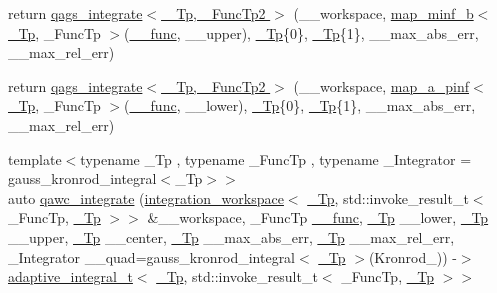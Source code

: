 \begin{DoxyCompactItemize}
\item 
return \hyperlink{namespace____gnu__cxx_a82afc5fe73ee3fd1e16fd7b7f126379f}{qags\+\_\+integrate$<$ \+\_\+\+Tp, \+\_\+\+Func\+Tp2 $>$} (\+\_\+\+\_\+workspace, \hyperlink{struct____gnu__cxx_1_1map__minf__b}{map\+\_\+minf\+\_\+b}$<$ \hyperlink{namespace____gnu__cxx_a3b19a9c800ca194374ef9172290f7d79}{\+\_\+\+Tp}, \+\_\+\+Func\+Tp $>$(\hyperlink{namespace____gnu__cxx_af2b2f0c7a2ae72b922b1afefae5a65b2}{\+\_\+\+\_\+func}, \+\_\+\+\_\+upper), \hyperlink{namespace____gnu__cxx_a3b19a9c800ca194374ef9172290f7d79}{\+\_\+\+Tp}\{0\}, \hyperlink{namespace____gnu__cxx_a3b19a9c800ca194374ef9172290f7d79}{\+\_\+\+Tp}\{1\}, \+\_\+\+\_\+max\+\_\+abs\+\_\+err, \+\_\+\+\_\+max\+\_\+rel\+\_\+err)
\item 
return \hyperlink{namespace____gnu__cxx_ae5530a44e048f341ccc448df258d49d3}{qags\+\_\+integrate$<$ \+\_\+\+Tp, \+\_\+\+Func\+Tp2 $>$} (\+\_\+\+\_\+workspace, \hyperlink{struct____gnu__cxx_1_1map__a__pinf}{map\+\_\+a\+\_\+pinf}$<$ \hyperlink{namespace____gnu__cxx_a3b19a9c800ca194374ef9172290f7d79}{\+\_\+\+Tp}, \+\_\+\+Func\+Tp $>$(\hyperlink{namespace____gnu__cxx_af2b2f0c7a2ae72b922b1afefae5a65b2}{\+\_\+\+\_\+func}, \+\_\+\+\_\+lower), \hyperlink{namespace____gnu__cxx_a3b19a9c800ca194374ef9172290f7d79}{\+\_\+\+Tp}\{0\}, \hyperlink{namespace____gnu__cxx_a3b19a9c800ca194374ef9172290f7d79}{\+\_\+\+Tp}\{1\}, \+\_\+\+\_\+max\+\_\+abs\+\_\+err, \+\_\+\+\_\+max\+\_\+rel\+\_\+err)
\item 
{\footnotesize template$<$typename \+\_\+\+Tp , typename \+\_\+\+Func\+Tp , typename \+\_\+\+Integrator  = gauss\+\_\+kronrod\+\_\+integral$<$\+\_\+\+Tp$>$$>$ }\\auto \hyperlink{namespace____gnu__cxx_a2d5a79b861842d746035f4ae626e3056}{qawc\+\_\+integrate} (\hyperlink{class____gnu__cxx_1_1integration__workspace}{integration\+\_\+workspace}$<$ \hyperlink{namespace____gnu__cxx_a3b19a9c800ca194374ef9172290f7d79}{\+\_\+\+Tp}, std\+::invoke\+\_\+result\+\_\+t$<$ \+\_\+\+Func\+Tp, \hyperlink{namespace____gnu__cxx_a3b19a9c800ca194374ef9172290f7d79}{\+\_\+\+Tp} $>$$>$ \&\+\_\+\+\_\+workspace, \+\_\+\+Func\+Tp \hyperlink{namespace____gnu__cxx_af2b2f0c7a2ae72b922b1afefae5a65b2}{\+\_\+\+\_\+func}, \hyperlink{namespace____gnu__cxx_a3b19a9c800ca194374ef9172290f7d79}{\+\_\+\+Tp} \+\_\+\+\_\+lower, \hyperlink{namespace____gnu__cxx_a3b19a9c800ca194374ef9172290f7d79}{\+\_\+\+Tp} \+\_\+\+\_\+upper, \hyperlink{namespace____gnu__cxx_a3b19a9c800ca194374ef9172290f7d79}{\+\_\+\+Tp} \+\_\+\+\_\+center, \hyperlink{namespace____gnu__cxx_a3b19a9c800ca194374ef9172290f7d79}{\+\_\+\+Tp} \+\_\+\+\_\+max\+\_\+abs\+\_\+err, \hyperlink{namespace____gnu__cxx_a3b19a9c800ca194374ef9172290f7d79}{\+\_\+\+Tp} \+\_\+\+\_\+max\+\_\+rel\+\_\+err, \+\_\+\+Integrator \+\_\+\+\_\+quad=gauss\+\_\+kronrod\+\_\+integral$<$ \hyperlink{namespace____gnu__cxx_a3b19a9c800ca194374ef9172290f7d79}{\+\_\+\+Tp} $>$(Kronrod\+\_)) -\/$>$ \hyperlink{struct____gnu__cxx_1_1adaptive__integral__t}{adaptive\+\_\+integral\+\_\+t}$<$ \hyperlink{namespace____gnu__cxx_a3b19a9c800ca194374ef9172290f7d79}{\+\_\+\+Tp}, std\+::invoke\+\_\+result\+\_\+t$<$ \+\_\+\+Func\+Tp, \hyperlink{namespace____gnu__cxx_a3b19a9c800ca194374ef9172290f7d79}{\+\_\+\+Tp} $>$$>$

\end{DoxyCompactItemize}
